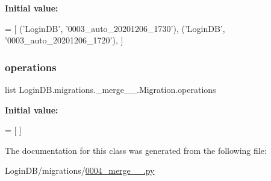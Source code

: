 {\bfseries Initial value\+:}
\begin{DoxyCode}
=  [
        (\textcolor{stringliteral}{'LoginDB'}, \textcolor{stringliteral}{'0003\_auto\_20201206\_1730'}),
        (\textcolor{stringliteral}{'LoginDB'}, \textcolor{stringliteral}{'0003\_auto\_20201206\_1720'}),
    ]
\end{DoxyCode}
\mbox{\label{class_login_d_b_1_1migrations_1_10004__merge__20201206__1751_1_1_migration_a918d870d3e269a852ff0bc7de9a132de}} 
\subsubsection{\texorpdfstring{operations}{operations}}
{\footnotesize\ttfamily list Login\+D\+B.\+migrations.\+\_\+merge\+\_\+\_.\+Migration.\+operations\hspace{0.3cm}{\ttfamily [static]}}

{\bfseries Initial value\+:}
\begin{DoxyCode}
=  [
    ]
\end{DoxyCode}


The documentation for this class was generated from the following file\+:\begin{DoxyCompactItemize}
\item 
Login\+D\+B/migrations/\hyperlink{0004__merge__20201206__1751_8py}{0004\+\_\+merge\+\_\+\_.\+py}\end{DoxyCompactItemize}
